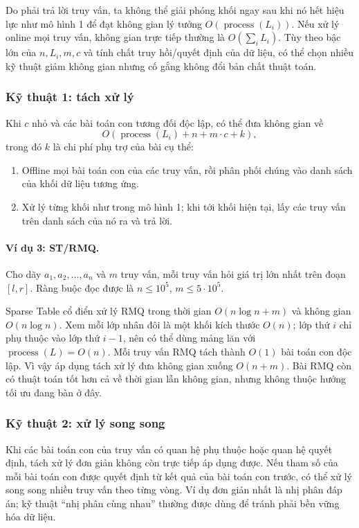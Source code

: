 \documentclass[11pt]{article}
\begin{document}
Do phải trả lời truy vấn, ta không thể giải phóng khối ngay sau khi nó hết hiệu
lực như mô hình 1 để đạt không gian lý tưởng
$O(\operatorname{process}(L_i))$. Nếu xử lý online mọi truy vấn, không gian
trực tiếp thường là $O(\sum_i L_i)$. Tùy theo bậc lớn của $n,L_i,m,c$ và tính
chất truy hồi/quyết định của dữ liệu, có thể chọn nhiều kỹ thuật giảm không
gian nhưng cố gắng không đổi bản chất thuật toán.

\subsubsection{Kỹ thuật 1: tách xử lý}

Khi $c$ nhỏ và các bài toán con tương đối độc lập, có thể đưa không gian về
\[
  O(\operatorname{process}(L_i)+n+m\cdot c+k),
\]
trong đó $k$ là chi phí phụ trợ của bài cụ thể:
\begin{enumerate}
  \item Offline mọi bài toán con của các truy vấn, rồi phân phối chúng vào
  danh sách của khối dữ liệu tương ứng.
  \item Xử lý từng khối như trong mô hình 1; khi tới khối hiện tại, lấy các
  truy vấn trên danh sách của nó ra và trả lời.
\end{enumerate}

\paragraph{Ví dụ 3: ST/RMQ.}
Cho dãy $a_1,a_2,\ldots,a_n$ và $m$ truy vấn, mỗi truy vấn hỏi giá trị lớn nhất
trên đoạn $[l,r]$. Ràng buộc đọc được là $n\le 10^5$,
$m\le 5\cdot 10^5$.

Sparse Table cổ điển xử lý RMQ trong thời gian $O(n\log n+m)$ và không gian
$O(n\log n)$. Xem mỗi lớp nhân đôi là một khối kích thước $O(n)$; lớp thứ $i$
chỉ phụ thuộc vào lớp thứ $i-1$, nên có thể dùng mảng lăn với
$\operatorname{process}(L)=O(n)$. Mỗi truy vấn RMQ tách thành $O(1)$ bài toán
con độc lập. Vì vậy áp dụng tách xử lý đưa không gian xuống $O(n+m)$. Bài RMQ
còn có thuật toán tốt hơn cả về thời gian lẫn không gian, nhưng không thuộc
hướng tối ưu đang bàn ở đây.

\subsubsection{Kỹ thuật 2: xử lý song song}

Khi các bài toán con của truy vấn có quan hệ phụ thuộc hoặc quan hệ quyết định,
tách xử lý đơn giản không còn trực tiếp áp dụng được. Nếu tham số của mỗi bài
toán con được quyết định từ kết quả của bài toán con trước, có thể xử lý song
song nhiều truy vấn theo từng vòng. Ví dụ đơn giản nhất là nhị phân đáp án; kỹ
thuật ``nhị phân cùng nhau'' thường được dùng để tránh phải bền vững hóa dữ
liệu.
\end{document}
